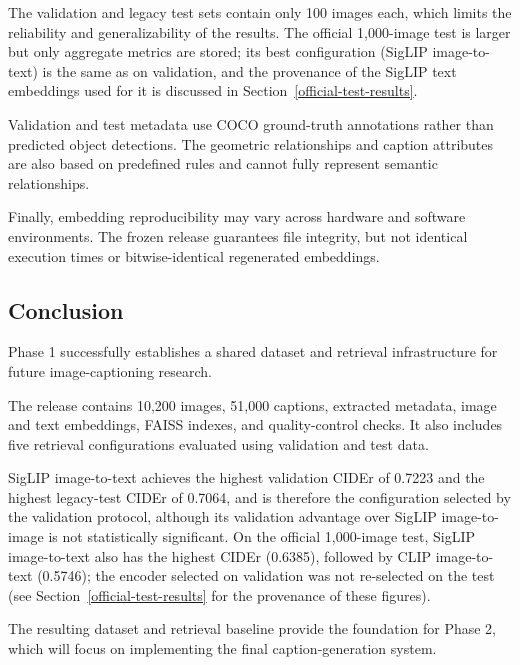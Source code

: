 \documentclass{article}
\begin{document}
The validation and legacy test sets contain only 100 images each, which
limits the reliability and generalizability of the results. The official
1,000-image test is larger but only aggregate metrics are stored; its best
configuration (SigLIP image-to-text) is the same as on validation, and the provenance of the SigLIP text
embeddings used for it is discussed in Section~\ref{official-test-results}.

Validation and test metadata use COCO ground-truth annotations
rather than predicted object detections. The geometric relationships
and caption attributes are also based on predefined rules and
cannot fully represent semantic relationships.

Finally, embedding reproducibility may vary across hardware and
software environments. The frozen release guarantees file integrity,
but not identical execution times or bitwise-identical regenerated
embeddings.

\newpage
\subsection{Conclusion}\label{conclusion}

Phase 1 successfully establishes a shared dataset and retrieval
infrastructure for future image-captioning research.

The release contains 10,200 images, 51,000 captions, extracted
metadata, image and text embeddings, FAISS indexes, and quality-control
checks. It also includes five retrieval configurations evaluated
using validation and test data.

SigLIP image-to-text achieves the highest validation CIDEr of
0.7223 and the highest legacy-test CIDEr of 0.7064, and is therefore the
configuration selected by the validation protocol, although its validation
advantage over SigLIP image-to-image is not statistically significant. On
the official 1,000-image test, SigLIP image-to-text also has the highest
CIDEr (0.6385), followed by CLIP image-to-text (0.5746); the encoder selected
on validation was not re-selected on the test (see
Section~\ref{official-test-results} for the provenance of these figures).

The resulting dataset and retrieval baseline provide the foundation
for Phase 2, which will focus on implementing the final
caption-generation system.

\newpage


\end{document}
